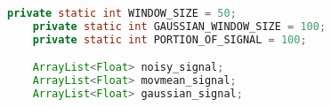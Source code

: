 \begin{lstlisting}[language=Java,  basicstyle=\footnotesize]
 	private static int WINDOW_SIZE = 50;
	private static int GAUSSIAN_WINDOW_SIZE = 100;
	private static int PORTION_OF_SIGNAL = 100;

	ArrayList<Float> noisy_signal;	
	ArrayList<Float> movmean_signal;
	ArrayList<Float> gaussian_signal;
 


\end{lstlisting} 